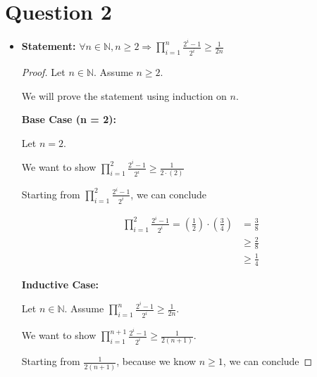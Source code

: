\documentclass[12pt]{article}
\begin{document}
\section*{Question 2}
\begin{itemize}
    \item

    \textbf{Statement:} $\forall n \in \mathbb{N}, n \geq 2 \Rightarrow
    \prod\limits_{i=1}^n \frac{2^i - 1}{2^i} \geq \frac{1}{2n}$

    \bigskip

    \begin{proof}
        Let $n \in \mathbb{N}$. Assume $n \geq 2$.

        \bigskip

        We will prove the statement using induction on $n$.

        \bigskip

        \textbf{Base Case (n = 2):}

        \bigskip

        Let $n = 2$.

        \bigskip

        We want to show $\prod\limits_{i=1}^2 \frac{2^i - 1}{2^i} \geq \frac{1}{2 \cdot (2)}$

        \bigskip

        Starting from $\prod\limits_{i=1}^2 \frac{2^i - 1}{2^i}$, we can conclude

        \setcounter{equation}{0}
        \begin{align}
            \prod\limits_{i=1}^2 \frac{2^i - 1}{2^i} = \left( \frac{1}{2} \right) \cdot \left( \frac{3}{4} \right) &= \frac{3}{8}\\
            &\geq \frac{2}{8}\\
            &\geq \frac{1}{4}
        \end{align}

        \bigskip

        \textbf{Inductive Case:}

        \bigskip

        Let $n \in \mathbb{N}$. Assume $\prod\limits_{i=1}^n \frac{2^i - 1}{2^i}
        \geq \frac{1}{2n}$.

        \bigskip

        We want to show $\prod\limits_{i=1}^{n+1} \frac{2^i - 1}{2^i} \geq \frac{1}{2(n+1)}$.

        \bigskip

        Starting from $\frac{1}{2(n+1)}$, because we know $n \geq 1$, we can conclude


\end{proof}
\end{itemize}
\end{document}
